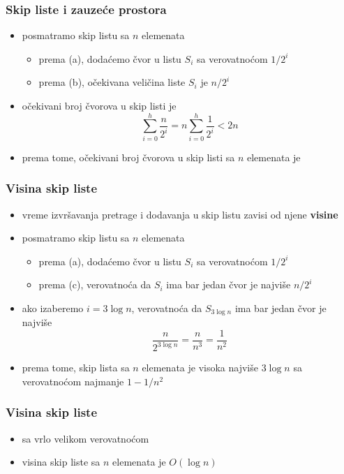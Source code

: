 \documentclass[compress,aspectratio=169]{beamer}
\begin{document}
\begin{frame}[fragile]
  \frametitle{Skip liste i zauzeće prostora}
  \begin{itemize}
    \item posmatramo skip listu sa $n$ elemenata
    \begin{itemize}
      \item prema (a), dodaćemo čvor u listu $S_i$ sa verovatnoćom $1/2^i$
      \item prema (b), očekivana veličina liste $S_i$ je $n/2^i$
    \end{itemize}
    \item očekivani broj čvorova u skip listi je
    $$ \sum_{i=0}^h \frac{n}{2^i} = n \sum_{i=0}^h \frac{1}{2^i} < 2n$$
    \item prema tome, očekivani broj čvorova u skip listi sa $n$ elemenata je 
  \end{itemize}
\end{frame}

\begin{frame}[fragile]
  \frametitle{Visina skip liste}
  \begin{itemize}
    \item vreme izvršavanja pretrage i dodavanja u skip listu zavisi od njene \textbf{visine}
    \item posmatramo skip listu sa $n$ elemenata
    \begin{itemize}
      \item prema (a), dodaćemo čvor u listu $S_i$ sa verovatnoćom $1/2^i$
      \item prema (c), verovatnoća da $S_i$ ima bar jedan čvor je najviše $n/2^i$
    \end{itemize}
    \item ako izaberemo $i=3\log n$, verovatnoća da $S_{3\log n}$ ima bar jedan čvor je najviše
    $$\frac{n}{2^{3\log n}} = \frac{n}{n^3} = \frac{1}{n^2}$$
    \item prema tome, skip lista sa $n$ elemenata je visoka najviše $3\log n$ sa verovatnoćom najmanje $1-1/n^2$
  \end{itemize}
\end{frame}

\begin{frame}[fragile]
  \frametitle{Visina skip liste}
  \begin{itemize}
    \item sa vrlo velikom verovatnoćom
    \item visina skip liste sa $n$ elemenata je $O(\log n)$
  \end{itemize}
\end{frame}
\end{document}
